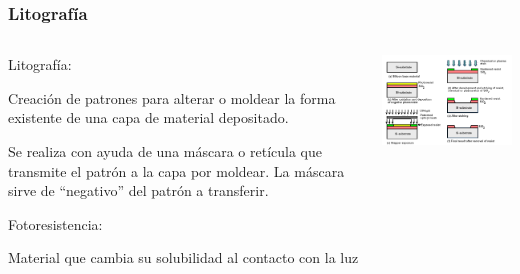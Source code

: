 \documentclass[aspectratio=169,10pt]{beamer}
\begin{document}
\begin{frame}
\frametitle{Litografía}
\begin{columns}
\begin{column}{0.4\textwidth}
Litografía:

Creación de patrones para alterar o moldear la forma existente de una capa de material depositado.

\vspace{5mm}
Se realiza con ayuda de una máscara o retícula que transmite el patrón a la capa por moldear. La máscara sirve de “negativo” del patrón a transferir.

\vspace{5mm}
Fotoresistencia: 

Material que cambia su solubilidad al contacto con la luz
\end{column}
\begin{column}{0.6\textwidth}
\includegraphics[width=9cm]{lithography}
\end{column}
\end{columns}
\end{frame}
\end{document}
